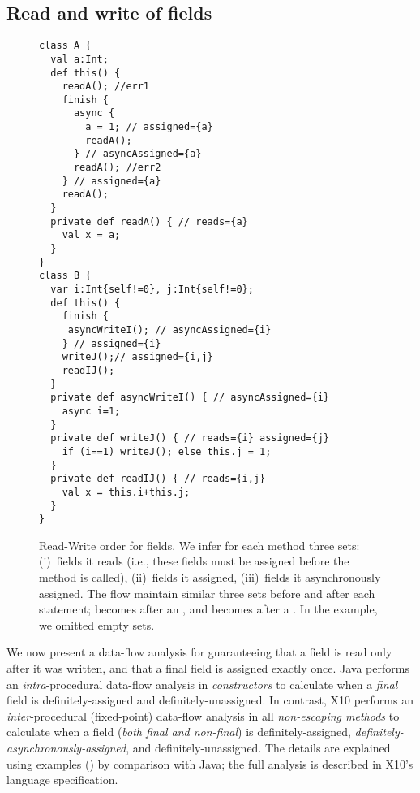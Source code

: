 \subsection{Read and write of fields}
\label{Section:Read-write-rules}


\begin{figure}
\begin{lstlisting}
class A {
  val a:Int;
  def this() {
    readA(); //err1
    finish {
      async {
        a = 1; // assigned={a}
        readA();
      } // asyncAssigned={a}
      readA(); //err2
    } // assigned={a}
    readA();
  }
  private def readA() { // reads={a}
    val x = a;
  }
}
class B {
  var i:Int{self!=0}, j:Int{self!=0};
  def this() {
    finish {
     asyncWriteI(); // asyncAssigned={i}
    } // assigned={i}
    writeJ();// assigned={i,j}
    readIJ();
  }
  private def asyncWriteI() { // asyncAssigned={i}
    async i=1;
  }
  private def writeJ() { // reads={i} assigned={j}
    if (i==1) writeJ(); else this.j = 1;
  }
  private def readIJ() { // reads={i,j}
    val x = this.i+this.j;
  }
}
\end{lstlisting}
\caption{Read-Write order for fields.
    We infer for each method three sets:
        (i)~fields it reads (i.e., these fields must be assigned before the method is called),
        (ii)~fields it assigned,
        (iii)~fields it asynchronously assigned.
    The flow maintain similar three sets before and after each statement;
         becomes  after an ,
        and  becomes  after a .
    In the example, we omitted empty sets.
    }
\label{Figure:Read-Write-Order}
\end{figure}

We now present a data-flow analysis for guaranteeing
    that a field is read only after it was written,
    and that a final field is assigned exactly once.
Java performs an \emph{intra}-procedural data-flow analysis in \emph{constructors} to calculate
    when a \emph{final} field is definitely-assigned and definitely-unassigned.
In contrast, X10 performs an \emph{inter}-procedural (fixed-point) data-flow analysis
    in all \emph{non-escaping methods} to calculate
    when {a} field (\emph{both final and non-final}) is
    definitely-assigned, \emph{definitely-asynchronously-assigned}, and definitely-unassigned.
The details are explained using examples () by comparison with Java;
    the full analysis is described in X10's language specification.

